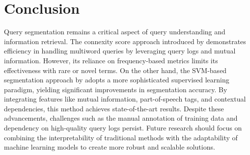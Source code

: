 \section{Conclusion} \label{conclusion}

Query segmentation remains a critical aspect of query understanding and information retrieval. The connexity score approach introduced by \citet{Risvik:2003} demonstrates efficiency in handling multiword queries by leveraging query logs and mutual information. However, its reliance on frequency-based metrics limits its effectiveness with rare or novel terms. On the other hand, the SVM-based segmentation approach by \citet{Bergsma:2007} adopts a more sophisticated supervised learning paradigm, yielding significant improvements in segmentation accuracy. By integrating features like mutual information, part-of-speech tags, and contextual dependencies, this method achieves state-of-the-art results. Despite these advancements, challenges such as the manual annotation of training data and dependency on high-quality query logs persist. Future research should focus on combining the interpretability of traditional methods with the adaptability of machine learning models to create more robust and scalable solutions.